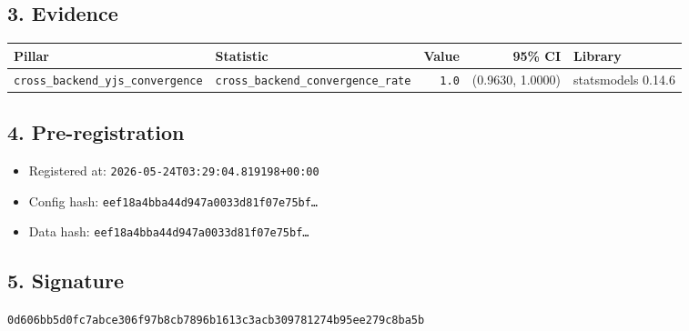 \documentclass{article}
\begin{document}
\subsection*{3. Evidence}
\begin{tabular}{llrrl}\toprule
\textbf{Pillar} & \textbf{Statistic} & \textbf{Value} & \textbf{95\% CI} & \textbf{Library} \\\midrule
\texttt{cross\_backend\_yjs\_convergence} & \texttt{cross\_backend\_convergence\_rate} & \texttt{1.0} & (0.9630, 1.0000) & statsmodels 0.14.6 \\
\bottomrule\end{tabular}
\subsection*{4. Pre-registration}
\begin{itemize}
\item Registered at: \texttt{2026-05-24T03:29:04.819198+00:00}
\item Config hash: \texttt{eef18a4bba44d947a0033d81f07e75bf\dots}
\item Data hash: \texttt{eef18a4bba44d947a0033d81f07e75bf\dots}
\end{itemize}
\subsection*{5. Signature}
\texttt{0d606bb5d0fc7abce306f97b8cb7896b1613c3acb309781274b95ee279c8ba5b}\\
\end{document}
